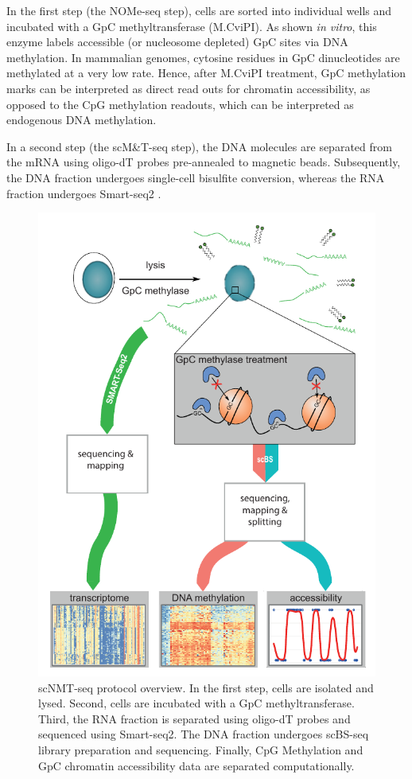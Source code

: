 In the first step (the NOMe-seq step), cells are sorted into individual wells and incubated with a GpC methyltransferase (M.CviPI). As shown \textit{in vitro}, this enzyme labels accessible (or nucleosome depleted) GpC sites via DNA methylation\cite{Kilgore2007, Kelly2012}. In mammalian genomes, cytosine residues in GpC dinucleotides are methylated at a very low rate. Hence, after M.CviPI treatment, GpC methylation marks can be interpreted as direct read outs for chromatin accessibility, as opposed to the CpG methylation readouts, which can be interpreted as endogenous DNA methylation\cite{Kilgore2007, Kelly2012}.

In a second step (the scM\&T-seq step), the DNA molecules are separated from the mRNA using oligo-dT probes pre-annealed to magnetic beads. Subsequently, the DNA fraction undergoes single-cell bisulfite conversion\cite{Smallwood2014}, whereas the RNA fraction undergoes Smart-seq2 \cite{Picelli2014}.\\

\begin{figure}[H]
	\centering
	\includegraphics[width=0.6\linewidth]{scNMT_protocol}
	\caption[]{scNMT-seq protocol overview. In the first step, cells are isolated and lysed. Second, cells are incubated with a GpC methyltransferase. Third, the RNA fraction is separated using oligo-dT probes and sequenced using Smart-seq2. The DNA fraction undergoes scBS-seq library preparation and sequencing. Finally, CpG Methylation and GpC chromatin accessibility data are separated computationally.}
	\label{fig:scnmt_protocol}
\end{figure}

